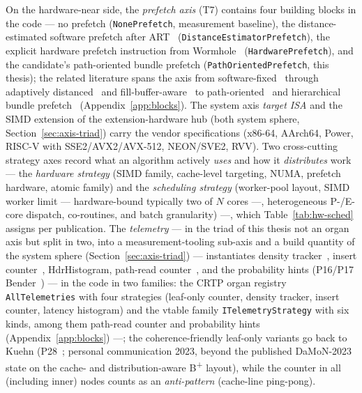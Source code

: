 \begin{nurlang}
On the hardware-near side, the \emph{prefetch axis} (T7) contains four building blocks in the code --- no
prefetch (\texttt{None\allowbreak{}Prefetch}, measurement baseline), the distance-estimated software prefetch after
ART~\cite{leis2013art} (\texttt{Distance\allowbreak{}Estimator\allowbreak{}Prefetch}), the explicit
hardware prefetch instruction from Wormhole~\cite{wu2019wormhole} (\texttt{Hardware\allowbreak{}Prefetch}), and
the candidate's path-oriented bundle prefetch (\texttt{Path\allowbreak{}Oriented\allowbreak{}Prefetch},
this thesis); the related literature spans the axis from software-fixed~\cite{chen2001prefetch} through
adaptively distanced~\cite{khan2010adaptive} and fill-buffer-aware~\cite{mahling2025hotpath} to
path-oriented~\cite{zhang2024pathprefix} and hierarchical bundle prefetch~\cite{zhang2025hierarchical}
(Appendix~\ref{app:blocks}). The system axis \emph{target ISA} and the SIMD extension of the
extension-hardware hub (both system sphere, Section~\ref{sec:axis-triad}) carry
the vendor specifications (x86-64, AArch64, Power, RISC-V with SSE2/AVX2/AVX-512, NEON/SVE2, RVV). Two
cross-cutting strategy axes record what an algorithm actively \emph{uses} and how it \emph{distributes}
work --- the \emph{hardware strategy} (SIMD family, cache-level targeting, NUMA,
prefetch hardware, atomic family) and the \emph{scheduling strategy} (worker-pool layout,
SIMD worker limit --- hardware-bound typically two of $N$ cores ---, heterogeneous P-/E-core dispatch,
co-routines, and batch granularity) ---, which Table~\ref{tab:hw-sched}
assigns per publication. The \emph{telemetry} --- in the triad of this thesis not an organ axis but
split in two, into a measurement-tooling sub-axis and a build quantity of the system sphere
(Section~\ref{sec:axis-triad}) --- instantiates density tracker~\cite{leis2013art},
insert counter~\cite{binna2018hot}, HdrHistogram, path-read counter~\cite{zhang2024pathprefix}, and the
probability hints (P16/P17 Bender~\cite{bender2000cobtree,bender2005coboblivious}) --- in the code in two
families: the CRTP organ registry \texttt{All\allowbreak{}Telemetries} with four strategies (leaf-only counter,
density tracker, insert counter, latency histogram) and the vtable family
\texttt{ITelemetry\allowbreak{}Strategy} with six kinds, among them path-read counter and probability hints
(Appendix~\ref{app:blocks}) ---; the
coherence-friendly leaf-only variants go back to Kuehn (P28~\cite{kuehn2023bplustree};
personal communication 2023, beyond the published DaMoN-2023 state on the cache- and
distribution-aware B\textsuperscript{+} layout), while the
counter in all (including inner) nodes counts as an \emph{anti-pattern} (cache-line ping-pong).
\end{nurlang}
